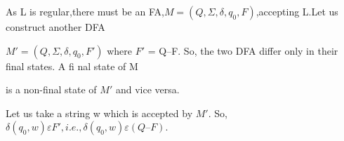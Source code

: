 \documentclass[10pt,a4paper]{article}
\begin{document}
As L is regular,there must be an FA,$M = (Q, \Sigma, \delta, q_{0}, F)$,accepting L.Let us construct another DFA

\begin{flushleft}
  $M\prime = (Q, \Sigma, \delta, q_{0}, F\prime)$ where $F\prime$ = Q–F. So, the two DFA differ only in their final states. A fi nal state of M

is a non-final state of $M\prime$ and vice versa.
\end{flushleft}

Let us take a string w which is accepted by $M\prime$. So,$\delta(q_{0}, w) \varepsilon F\prime, i.e., \delta(q_{0}, w) \varepsilon (Q – F)$.
\end{document}
